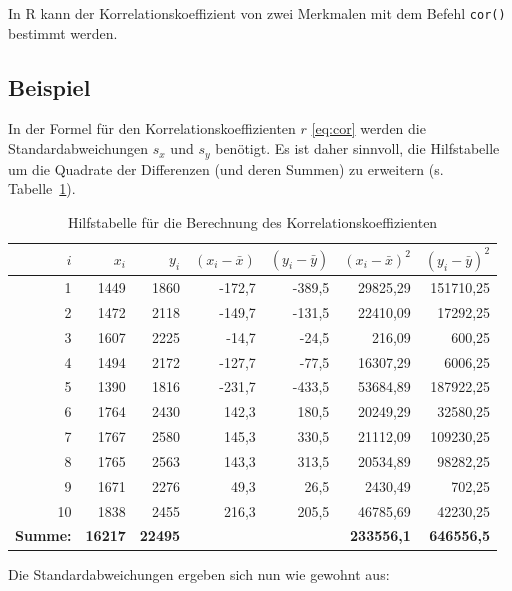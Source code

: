 \documentclass[
  11pt,
  ngerman,
  a4paper,
]{report}
\newenvironment{rtip}{
  \medskip
  \begin{tcolorbox}[colframe=purple,colback=light_gray,title=Softwarehinweis]
}{
  \end{tcolorbox}
  \medskip
}
\begin{document}
\begin{rtip}
In R kann der Korrelationskoeffizient von zwei Merkmalen mit dem Befehl \verb|cor()| bestimmt werden.
\end{rtip}

\hypertarget{beispiel-25}{%
\subsection{Beispiel}\label{beispiel-25}}

In der Formel für den Korrelationskoeffizienten \(r\) \eqref{eq:cor} werden die Standardabweichungen \(s_x\) und \(s_y\) benötigt. Es ist daher sinnvoll, die Hilfstabelle um die Quadrate der Differenzen (und deren Summen) zu erweitern (s. Tabelle~\ref{tab:mathcor}).

\begin{table}

\caption{\label{tab:mathcor}\label{tab:mathcor}Hilfstabelle für die Berechnung des Korrelationskoeffizienten}
\centering
\begin{tabular}[t]{rrrrrrr}
\toprule
$i$ & $x_i$ & $y_i$ & $(x_i-\bar{x})$ & $(y_i-\bar{y})$ & $(x_i-\bar{x})^2$ & $(y_i-\bar{y})^2$\\
\midrule
1 & 1449 & 1860 & -172,7 & -389,5 & 29825,29 & 151710,25\\
2 & 1472 & 2118 & -149,7 & -131,5 & 22410,09 & 17292,25\\
3 & 1607 & 2225 & -14,7 & -24,5 & 216,09 & 600,25\\
4 & 1494 & 2172 & -127,7 & -77,5 & 16307,29 & 6006,25\\
5 & 1390 & 1816 & -231,7 & -433,5 & 53684,89 & 187922,25\\
6 & 1764 & 2430 & 142,3 & 180,5 & 20249,29 & 32580,25\\
7 & 1767 & 2580 & 145,3 & 330,5 & 21112,09 & 109230,25\\
8 & 1765 & 2563 & 143,3 & 313,5 & 20534,89 & 98282,25\\
9 & 1671 & 2276 & 49,3 & 26,5 & 2430,49 & 702,25\\
10 & 1838 & 2455 & 216,3 & 205,5 & 46785,69 & 42230,25\\
\midrule
\textbf{Summe:} & \textbf{16217} & \textbf{22495} & \textbf{} & \textbf{} & \textbf{233556,1} & \textbf{646556,5}\\
\bottomrule
\end{tabular}
\end{table}

Die Standardabweichungen ergeben sich nun wie gewohnt aus:
\end{document}
